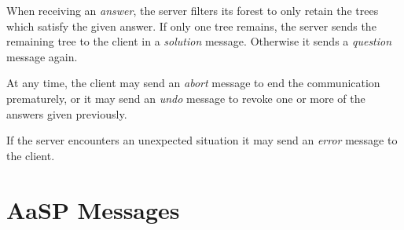\documentclass{scrartcl}
\newcommand{\messtype}[1]{\emph{#1}}
\begin{document}
When receiving an \messtype{answer}, the server filters its forest to only retain the trees which satisfy the given answer.
If only one tree remains, the server sends the remaining tree to the client in a \messtype{solution} message.
Otherwise it sends a \messtype{question} message again.

At any time, the client may send an \messtype{abort} message to end the communication prematurely, or it may send an \messtype{undo} message to revoke one or more of the answers given previously.

If the server encounters an unexpected situation it may send an \messtype{error} message to the client.

\section{AaSP Messages}
\label{sec:AaSP Messages}
\end{document}
